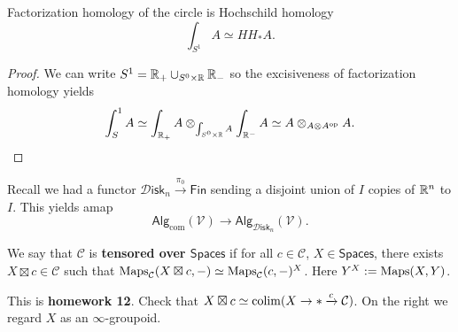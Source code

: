 \documentclass{amsart}
\begin{document}
\begin{corollary}
    Factorization homology of the circle is Hochschild homology
    \begin{equation*}
        \int_{S^1} A \simeq HH_*A.
    \end{equation*}
\end{corollary}
\begin{proof}
    We can write $S^1=\mathbb{R}_+\cup_{S^0\times\mathbb{R}}\mathbb{R}_-$ so the excisiveness of factorization homology yields
    \begin{equation*}
        \int_S^1 A\simeq \int_{\mathbb{R}_+}A \otimes_{\int_{S^0\times\mathbb{R}}A}\int_{\mathbb{R}^-}A \simeq A\otimes_{A\otimes A^\text{op}}A.
    \end{equation*}
\end{proof}

\begin{example}
    Recall we had a functor $\mathcal{D}\mathsf{isk}_n\xrightarrow{\pi_0} \mathsf{Fin}$ sending
    a disjoint union of $I$ copies of $\mathbb{R}^n$ to $I$. This yields amap
    \begin{equation*}
        \mathsf{Alg}_\text{com}(\mathcal{V}) \to \mathsf{Alg}_{\mathcal{D}\mathsf{isk}_n}(\mathcal{V}).
    \end{equation*}
\end{example}

\begin{definition}
    We say that $\mathcal{C}$ is \textbf{tensored over $\mathsf{Spaces}$} if for all
    $c\in \mathcal{C}$, $X\in\mathsf{Spaces}$, there exists $X\boxtimes c\in\mathcal{C}$
    such that $\operatorname{Maps}_\mathcal{C}(X\boxtimes c,-)\simeq \operatorname{Maps}_{\mathcal{C}}(c,-)^X$.
    Here $Y^X:=\operatorname{Maps}(X,Y)$.
\end{definition}

\begin{exercise}
    This is \textbf{homework 12}. Check that $X\boxtimes c\simeq \operatorname*{colim}(X\to *\xrightarrow{c} \mathcal{C})$.
    On the right we regard $X$ as an $\infty$-groupoid.
\end{exercise}
\end{document}
